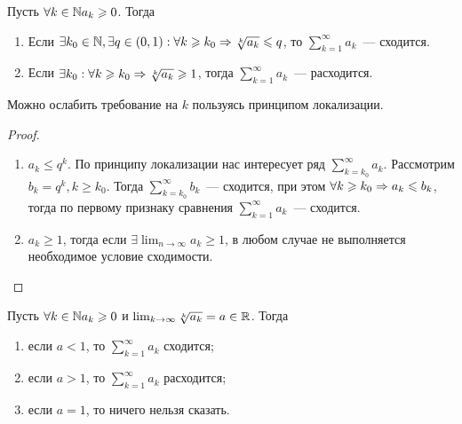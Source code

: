 \documentclass[../main.tex]{subfiles}
\begin{document}
\begin{proposition}
  Пусть $\forall k \in \mathbb{N} a_k \geqslant 0$. Тогда 
  \begin{enumerate}
    \item Если $\exists k_0 \in \mathbb{N}, \exists q \in (0, 1): \forall k \geqslant k_0 \Rightarrow \sqrt[k]{a_k } \leqslant q$, то $ \sum_{k=1}^{\infty} a_k $~---  сходится.
    \item Если $\exists k_0 : \forall k \geqslant k_0 \Rightarrow \sqrt[k]{a_k }\geqslant 1$, тогда $ \sum_{k=1}^{\infty} a_k $~--- расходится. 
  \end{enumerate}
\end{proposition}


\begin{note}
  Можно ослабить требование на $k$  пользуясь принципом локализации.
\end{note}


\begin{proof}
  \begin{enumerate}
    \item $a_k \leq q^{k}$. По принципу локализации нас интересует ряд $ \sum_{k=k_0 }^{\infty} a_k $. Рассмотрим $b_k = q^{k}, k\geq k_0$. Тогда $ \sum_{k=k_0 }^{\infty} b_k  $~---  сходится, при этом $\forall k \geqslant k_0 \Rightarrow a_k \leqslant b_k $, тогда по первому признаку сравнения $ \sum_{k=1}^{\infty} a_k $~--- сходится.
    \item $a_k \geq 1 $, тогда если $\exists \lim_{n \to \infty} a_k \geq 1$, в любом случае не выполняется необходимое условие сходимости. 
  \end{enumerate}
\end{proof}


\begin{corollary}
  Пусть $\forall k \in \mathbb{N} a_k \geqslant 0$ и $\lim_{k \to \infty} \sqrt[k]{a_k }= a \in \mathbb{R}$. Тогда
  \begin{enumerate}
    \item если $a<1$, то $ \sum_{k=1}^{\infty} a_k $ сходится;
    \item если $a > 1$, то $ \sum_{k=1}^{\infty} a_k $ расходится;
    \item если $a = 1$, то ничего нельзя сказать.  
  \end{enumerate} 
\end{corollary}
\end{document}
